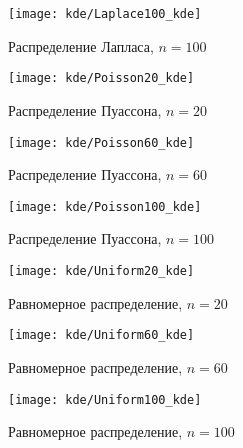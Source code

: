 \begin{figure}[H]
	\begin{center}
		\texttt{[image: kde/Laplace100\_kde]}
		\caption{Распределение Лапласа, $n=100$} 
		\label{pic:pic_name} 
	\end{center}
\end{figure}

\begin{figure}[H]
	\begin{center}
		\texttt{[image: kde/Poisson20\_kde]}
		\caption{Распределение Пуассона, $n=20$} 
		\label{pic:pic_name} 
	\end{center}
\end{figure}

\begin{figure}[H]
	\begin{center}
		\texttt{[image: kde/Poisson60\_kde]}
		\caption{Распределение Пуассона, $n=60$} 
		\label{pic:pic_name} 
	\end{center}
\end{figure}

\begin{figure}[H]
	\begin{center}
		\texttt{[image: kde/Poisson100\_kde]}
		\caption{Распределение Пуассона, $n=100$} 
		\label{pic:pic_name} 
	\end{center}
\end{figure}

\begin{figure}[H]
	\begin{center}
		\texttt{[image: kde/Uniform20\_kde]}
		\caption{Равномерное распределение, $n=20$} 
		\label{pic:pic_name} 
	\end{center}
\end{figure}

\begin{figure}[H]
	\begin{center}
		\texttt{[image: kde/Uniform60\_kde]}
		\caption{Равномерное распределение, $n=60$} 
		\label{pic:pic_name} 
	\end{center}
\end{figure}

\begin{figure}[H]
	\begin{center}
		\texttt{[image: kde/Uniform100\_kde]}
		\caption{Равномерное распределение, $n=100$} 
		\label{pic:pic_name} 
	\end{center}
\end{figure}

